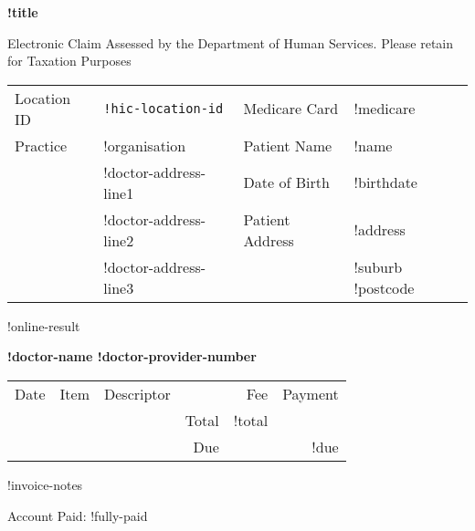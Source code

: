 \documentclass[12pt]{article}
\begin{document}
\begin{center}
{\bf \Large !title}

\vspace{3mm}

{\footnotesize Electronic Claim Assessed by the Department of Human Services. 
  Please retain for Taxation Purposes }

\end{center}

\vspace{8mm}

\begin{tabular}{llll}
  Location ID & \texttt{!hic-location-id} & Medicare Card & !medicare \\
  Practice & !organisation & Patient Name & !name \\
  & !doctor-address-line1 & Date of Birth & !birthdate \\
  & !doctor-address-line2 & Patient Address & !address \\
  & !doctor-address-line3 & & !suburb !postcode \\
\end{tabular}

\vspace{3mm}

!online-result

\vspace{3mm}

{\bf !doctor-name !doctor-provider-number}

\vspace{3mm}

\begin{tabularx}{\textwidth}{llp{50mm}rrr}
Date & Item & Descriptor & & Fee & Payment \\ \cmidrule(l){1-6}
\cmidrule(l){5-6}
& & & Total & !total  & \\
& & & Due & & !due \\
\end{tabularx}

!invoice-notes

\vspace{3mm}

Account Paid: !fully-paid
\end{document}

